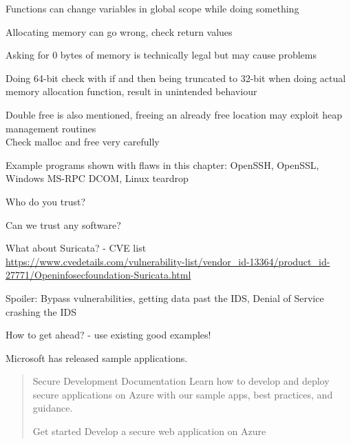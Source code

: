 \documentclass[Screen16to9,17pt]{foils}
\begin{document}

\begin{list2}
\item Functions can change variables in global scope while doing something
\item Allocating memory can go wrong, check return values
\item Asking for 0 bytes of memory is technically legal but may cause problems
\item Doing 64-bit check with if and then being truncated to 32-bit when doing actual memory allocation function, result in unintended behaviour
\item Double free is also mentioned, freeing an already free location may exploit heap management routines\\
Check malloc and free very carefully
\end{list2}




\begin{list2}
\item Example programs shown with flaws in this chapter: OpenSSH, OpenSSL, Windows MS-RPC DCOM, Linux teardrop
\item Who do you trust?
\item Can we trust any software?

\item What about Suricata? - CVE list\\
{\footnotesize\url{https://www.cvedetails.com/vulnerability-list/vendor_id-13364/product_id-27771/Openinfosecfoundation-Suricata.html}}
\item Spoiler: Bypass vulnerabilities, getting data past the IDS, Denial of Service crashing the IDS
\end{list2}



How to get ahead? - use existing good examples!

Microsoft has released sample applications.

\begin{quote}
Secure Development Documentation
Learn how to develop and deploy secure applications on Azure with our sample apps, best practices, and guidance.

Get started
Develop a secure web application on Azure
\end{quote}
\end{document}
